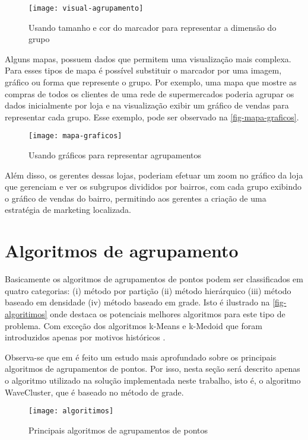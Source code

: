 		
\begin{figure}[htb]
	\caption{\label{fig-visual-agrupamento}Usando tamanho e cor do marcador para representar a dimensão do grupo}
	\begin{center}
	    \texttt{[image: visual-agrupamento]}
	\end{center}
\end{figure}

	Alguns mapas, possuem dados que permitem uma visualização mais complexa. Para esses tipos de mapa é possível substituir o marcador por uma imagem, gráfico ou forma que represente o grupo.  Por exemplo, uma mapa que mostre as compras de todos os clientes de uma rede de supermercados poderia agrupar os dados inicialmente por loja e na visualização exibir um gráfico de vendas para representar cada grupo. Esse exemplo, pode ser observado na \autoref{fig-mapa-graficos}.
	
\begin{figure}[htb]
	\caption{\label{fig-mapa-graficos}Usando gráficos para representar agrupamentos}
	\begin{center}
	    \texttt{[image: mapa-graficos]}
	\end{center}
\end{figure}

	Além disso, os gerentes dessas lojas,  poderiam efetuar um zoom no gráfico da loja que gerenciam e ver os subgrupos divididos por bairros, com cada grupo exibindo o gráfico de vendas do bairro, permitindo aos gerentes a criação de uma estratégia de marketing localizada.
	
\section{Algoritmos de agrupamento}	
	Basicamente os algoritmos de agrupamentos de pontos podem ser classificados em quatro categorias: (i) método por partição (ii) método hierárquico (iii) método baseado em densidade (iv) método baseado em grade. Isto é ilustrado na \autoref{fig-algoritimos} onde \cite[p. 35]{silva2010solap+} destaca os potenciais melhores algoritmos para este tipo de problema. Com exceção dos algoritmos k-Means e k-Medoid que foram introduzidos apenas por motivos históricos \cite[p. 36]{silva2010solap+}.
	
	Observa-se que em \cite[capítulo 2]{silva2010solap+} é feito um estudo mais aprofundado sobre os principais algoritmos de agrupamentos de pontos. Por isso, nesta seção será descrito apenas o algoritmo  utilizado na solução implementada neste trabalho, isto é, o algoritmo WaveCluster, que é baseado no método de grade.
\begin{figure}[htb]
	\caption{\label{fig-algoritimos}Principais algoritmos de agrupamentos de pontos}
	\begin{center}
	    \texttt{[image: algoritimos]}
	\end{center}
\end{figure}

